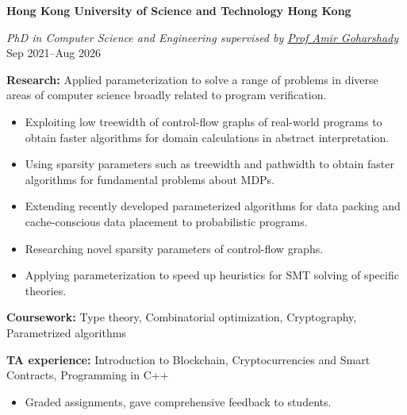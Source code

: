 \textbf{Hong Kong University of Science and Technology \hfill Hong Kong} \par
\textit{PhD in Computer Science and Engineering supervised by \href{https://scholar.google.com/citations?user=4o8gvAYAAAAJ&hl=en&oi=ao}{Prof Amir Goharshady}} \hfill Sep 2021--Aug 2026\par
\textbf{Research:} Applied parameterization to solve a range of problems in diverse areas of computer science broadly related to program verification.
    \begin{itemize}
        \item Exploiting low treewidth of control-flow graphs of real-world programs to obtain faster algorithms for domain calculations in abstract interpretation.
        \item Using sparsity parameters such as treewidth and pathwidth to obtain faster algorithms for fundamental problems about MDPs.
        \item Extending recently developed parameterized algorithms for data packing and cache-conscious data placement to probabilistic programs.
        \item Researching novel sparsity parameters of control-flow graphs. 
        \item Applying parameterization to speed up heuristics for SMT solving of specific theories.
    \end{itemize} \par
\textbf{Coursework:} Type theory, Combinatorial optimization, Cryptography, Parametrized algorithms\par
\textbf{TA experience:} Introduction to Blockchain, Cryptocurrencies and Smart Contracts, Programming in C++
\begin{itemize}
    \item Graded assignments, gave comprehensive feedback to students.
\end{itemize}

\fi